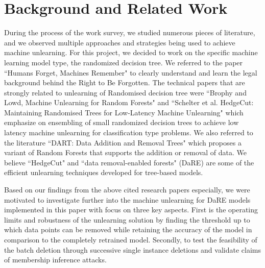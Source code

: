 \documentclass[11pt,letterpaper]{article}
\begin{document}

\section{Background and Related Work}
During the process of the work survey, we studied numerous pieces of literature, and we observed multiple approaches and strategies being used to achieve machine unlearning. For this project, we decided to work on the specific machine learning model type, the randomized decision tree. We referred to the paper ``Humans Forget, Machines Remember" \cite{eduardf1} to clearly understand and learn the legal background behind the Right to Be Forgotten. The technical papers that are strongly related to unlearning of Randomised decision tree were ``Brophy and Lowd, Machine Unlearning for Random Forests" \cite{Brophy} and ``Schelter et al. HedgeCut: Maintaining Randomised Trees for Low-Latency Machine Unlearning" \cite{Schelter} which emphasize on ensembling of small randomized decision trees to achieve low latency machine unlearning for classification type problems. We also referred to the literature ``DART: Data Addition and Removal Trees" \cite{BrophyDart} which proposes a variant of Random Forests that supports the addition or removal of data. We believe ``HedgeCut" and ``data removal-enabled forests" (DaRE) are some of the efficient unlearning techniques developed for tree-based models. 

Based on our findings from the above cited research papers especially, we were motivated to investigate further into the machine unlearning for DaRE models implemented in this paper \cite{Brophy} with focus on three key aspects. First is the operating limits and robustness of the unlearning solution by finding the threshold up to which data points can be removed while retaining the accuracy of the model in comparison to the completely retrained model. Secondly, to test the feasibility of the batch deletion through successive single instance deletions and validate claims of membership inference attacks.


\end{document}
